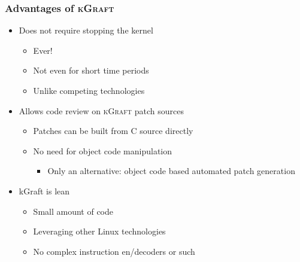 \documentclass[xcolor=dvipsnames,handout]{beamer}
\newcommand\kgr{\textsc{kGraft}\xspace}
\begin{document}
\begin{frame}
  \frametitle{Advantages of \kgr}

  \begin{itemize}
    \item Does not require stopping the kernel
    \pause
    \begin{itemize}
      \item Ever!
      \pause
      \item Not even for short time periods
      \item Unlike competing technologies
    \end{itemize}

    \pause

    \item Allows code review on \kgr patch sources
    \begin{itemize}
      \item Patches can be built from C source directly
      \item No need for object code manipulation
      \begin{itemize}
	\item Only an alternative: object code based automated patch generation
      \end{itemize}
    \end{itemize}

    \pause

    \item kGraft is lean
    \begin{itemize}
      \item Small amount of code
      \item Leveraging other Linux technologies
      \item No complex instruction en/decoders or such
    \end{itemize}

  \end{itemize}

\end{frame}
\end{document}
